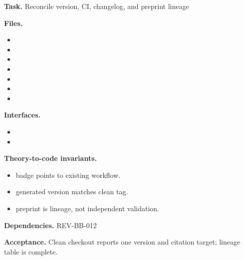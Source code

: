 \begin{statusbox}[CODE-BB-013]
\textbf{Task.} Reconcile version, CI, changelog, and preprint lineage\par
\textbf{Files.}
\begin{itemize}[leftmargin=1.7em,itemsep=1.5pt,topsep=2pt]
\item {}
\item {}
\item {}
\item {}
\item {}
\item {}
\item {}
\end{itemize}
\textbf{Interfaces.}
\begin{itemize}[leftmargin=1.7em,itemsep=1.5pt,topsep=2pt]
\item {}
\item {}
\end{itemize}
\textbf{Theory-to-code invariants.}
\begin{itemize}[leftmargin=1.7em,itemsep=1.5pt,topsep=2pt]
\item badge points to existing workflow.
\item generated version matches clean tag.
\item preprint is lineage, not independent validation.
\end{itemize}
\textbf{Dependencies.} REV-BB-012\par
\textbf{Acceptance.} Clean checkout reports one version and citation target; lineage table is complete.
\end{statusbox}


